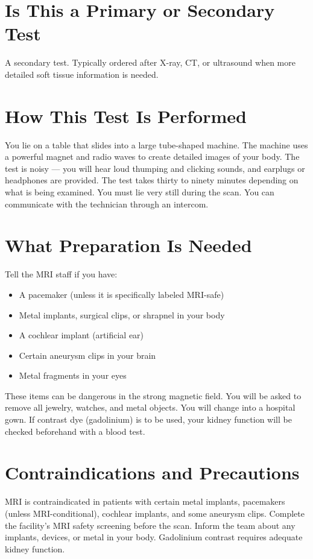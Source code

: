 \section*{Is This a Primary or Secondary Test}
A secondary test. Typically ordered after X-ray, CT, or ultrasound when more detailed soft tissue information is needed.

\section*{How This Test Is Performed}
You lie on a table that slides into a large tube-shaped machine. The machine uses a powerful magnet and radio waves to create detailed images of your body. The test is noisy --- you will hear loud thumping and clicking sounds, and earplugs or headphones are provided. The test takes thirty to ninety minutes depending on what is being examined. You must lie very still during the scan. You can communicate with the technician through an intercom.

\section*{What Preparation Is Needed}
Tell the MRI staff if you have:
\begin{itemize}
\item A pacemaker (unless it is specifically labeled MRI-safe)
\item Metal implants, surgical clips, or shrapnel in your body
\item A cochlear implant (artificial ear)
\item Certain aneurysm clips in your brain
\item Metal fragments in your eyes
\end{itemize}

These items can be dangerous in the strong magnetic field. You will be asked to remove all jewelry, watches, and metal objects. You will change into a hospital gown. If contrast dye (gadolinium) is to be used, your kidney function will be checked beforehand with a blood test.

\section*{Contraindications and Precautions}
MRI is contraindicated in patients with certain metal implants, pacemakers (unless MRI-conditional), cochlear implants, and some aneurysm clips. Complete the facility's MRI safety screening before the scan. Inform the team about any implants, devices, or metal in your body. Gadolinium contrast requires adequate kidney function.

